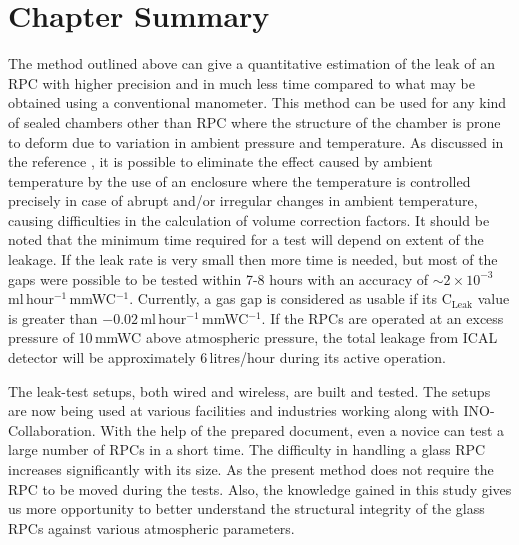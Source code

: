 \section{Chapter Summary}\label{sec:summary}
The method outlined above can give a quantitative estimation of the
leak of an RPC with higher precision and in much less time compared to
what may be obtained using a conventional manometer. This method can
be used for any kind of sealed chambers other than RPC where the
structure of the chamber is prone to deform due to variation in
ambient pressure and temperature. As discussed in the reference
\cite{rpcleak2016}, it is possible to eliminate the effect caused by
ambient temperature by the use of an enclosure where the temperature
is controlled precisely in case of abrupt and/or irregular changes in
ambient temperature, causing difficulties in the calculation of volume
correction factors. It should be noted that the minimum time required
for a test will depend on extent of the leakage. If the leak rate is
very small then more time is needed, but most of the gaps were
possible to be tested within 7-8 hours with an accuracy of
$\sim 2\times 10^{-3}$\,ml\,hour$^{-1}$\,mmWC$^{-1}$. Currently, a gas
gap is considered as usable if its $\textrm{C}_{\textrm{Leak}}$ value is
greater than $-0.02$\,ml\,hour$^{-1}$\,mmWC$^{-1}$. If the RPCs are
operated at an excess pressure of 10\,mmWC above atmospheric pressure,
the total leakage from ICAL detector will be approximately
6\,litres/hour during its active operation.

The leak-test setups, both wired and wireless, are built and tested.
The setups are now being used at various facilities and industries
working along with INO-Collaboration. With the help of the prepared
document, even a novice can test a large number of RPCs in a short
time. The difficulty in handling a glass RPC increases significantly
with its size. As the present method does not require the RPC to be
moved during the tests. Also, the
knowledge gained in this study gives us more opportunity to better
understand the structural integrity of the glass RPCs against various
atmospheric parameters.
